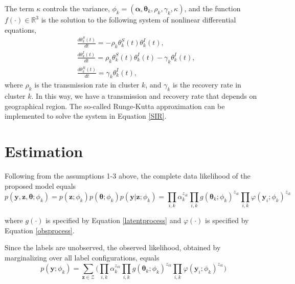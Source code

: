 \documentclass[10pt,a4paper]{article}
\begin{document}
\begin{enumerate}
	The term $\kappa$ controls the variance, $\phi_k = (\boldsymbol{\alpha}, \boldsymbol{\theta}_k, \rho_k, \gamma_k, \kappa)$, and the function $f(\cdot) \in \mathbb{R}^3$ is the solution to the following system of nonlinear differential equations,
	\begin{equation} \label{SIR}
		\begin{split}
			&\frac{d\theta_{k}^S(t)}{dt} = -\rho_{k}\theta_{k}^S(t)\theta_{k}^I(t), \\
			& \frac{d\theta_{k}^I(t)}{dt} = 
			\rho_{k}\theta_{k}^S(t)\theta_{k}^I(t) - \gamma_{k} \theta_{k}^I(t), \\
			& \frac{d\theta_{k}^R(t)}{dt} = 
			\gamma_{k} \theta_{k}^I(t),
		\end{split}
	\end{equation}
where $\rho_{k}$ is the transmission rate in cluster $k$, and $\gamma_{k}$ is the recovery rate in cluster $k$. In this way, we have a transmission and recovery rate that depends on geographical region. The so-called Runge-Kutta approximation can be implemented to solve the system in Equation \ref{SIR}.
	
\end{enumerate}



\section{Estimation}

Following from the assumptions 1-3 above, the complete data likelihood of the proposed model equals
%
\begin{equation}\label{complete_likelihood}
	p(\mathbf{y}, \mathbf{z}, \mathbf{\boldsymbol{\theta}}; \phi_k) =
	p(\mathbf{z}; \phi_k) 
	p(\mathbf{\boldsymbol{\theta}}; \phi_k)
	p(\mathbf{y}|\mathbf{z}; \phi_k) = 
	\prod_{i,k} \alpha_k^{z_{ik}} 
	\prod_{i,k} g(\boldsymbol{\theta}_k; \phi_k)^{z_{ik}} 
	\prod_{i,k} \varphi(\mathbf{y}_{i}; \phi_{k})^{{z_{ik}}} 
\end{equation}

%
where $g(\cdot)$ is specified by Equation \ref{latentprocess} and $\varphi(\cdot)$ is specified by Equation \ref{obsprocess}.

Since the labels are unobserved, the observed likelihood, obtained by marginalizing over all label configurations, equals
%
$$
p(\mathbf{y}; \phi_k) =
 \sum_{\mathbf{z} \in \mathcal{Z}} 
 \bigg(  	
	\prod_{i,k} \alpha_k^{z_{ik}} 
	\prod_{i,k} g(\boldsymbol{\theta}_k; \phi_k)^{z_{ik}} 
	\prod_{i,k} \varphi(\mathbf{y}_{i}; \phi_{k})^{{z_{ik}}}   
\bigg)
$$
% 
\end{document}
